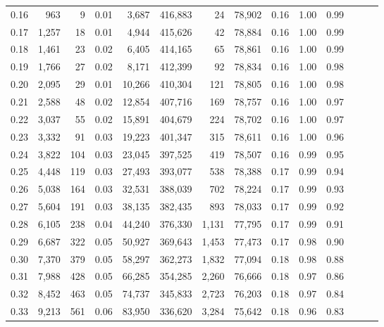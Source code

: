 \begin{tabular}{rrrrrrrrrrrrrr}
0.16 &     963 &      9 &  0.01 &    3,687 &  416,883 &      24 &  78,902 &  0.16 &  1.00 &      0.99 \\
0.17 &   1,257 &     18 &  0.01 &    4,944 &  415,626 &      42 &  78,884 &  0.16 &  1.00 &      0.99 \\
0.18 &   1,461 &     23 &  0.02 &    6,405 &  414,165 &      65 &  78,861 &  0.16 &  1.00 &      0.99 \\
0.19 &   1,766 &     27 &  0.02 &    8,171 &  412,399 &      92 &  78,834 &  0.16 &  1.00 &      0.98 \\
0.20 &   2,095 &     29 &  0.01 &   10,266 &  410,304 &     121 &  78,805 &  0.16 &  1.00 &      0.98 \\
0.21 &   2,588 &     48 &  0.02 &   12,854 &  407,716 &     169 &  78,757 &  0.16 &  1.00 &      0.97 \\
0.22 &   3,037 &     55 &  0.02 &   15,891 &  404,679 &     224 &  78,702 &  0.16 &  1.00 &      0.97 \\
0.23 &   3,332 &     91 &  0.03 &   19,223 &  401,347 &     315 &  78,611 &  0.16 &  1.00 &      0.96 \\
0.24 &   3,822 &    104 &  0.03 &   23,045 &  397,525 &     419 &  78,507 &  0.16 &  0.99 &      0.95 \\
0.25 &   4,448 &    119 &  0.03 &   27,493 &  393,077 &     538 &  78,388 &  0.17 &  0.99 &      0.94 \\
0.26 &   5,038 &    164 &  0.03 &   32,531 &  388,039 &     702 &  78,224 &  0.17 &  0.99 &      0.93 \\
0.27 &   5,604 &    191 &  0.03 &   38,135 &  382,435 &     893 &  78,033 &  0.17 &  0.99 &      0.92 \\
0.28 &   6,105 &    238 &  0.04 &   44,240 &  376,330 &   1,131 &  77,795 &  0.17 &  0.99 &      0.91 \\
0.29 &   6,687 &    322 &  0.05 &   50,927 &  369,643 &   1,453 &  77,473 &  0.17 &  0.98 &      0.90 \\
0.30 &   7,370 &    379 &  0.05 &   58,297 &  362,273 &   1,832 &  77,094 &  0.18 &  0.98 &      0.88 \\
0.31 &   7,988 &    428 &  0.05 &   66,285 &  354,285 &   2,260 &  76,666 &  0.18 &  0.97 &      0.86 \\
0.32 &   8,452 &    463 &  0.05 &   74,737 &  345,833 &   2,723 &  76,203 &  0.18 &  0.97 &      0.84 \\
0.33 &   9,213 &    561 &  0.06 &   83,950 &  336,620 &   3,284 &  75,642 &  0.18 &  0.96 &      0.83 \\

\end{tabular}
